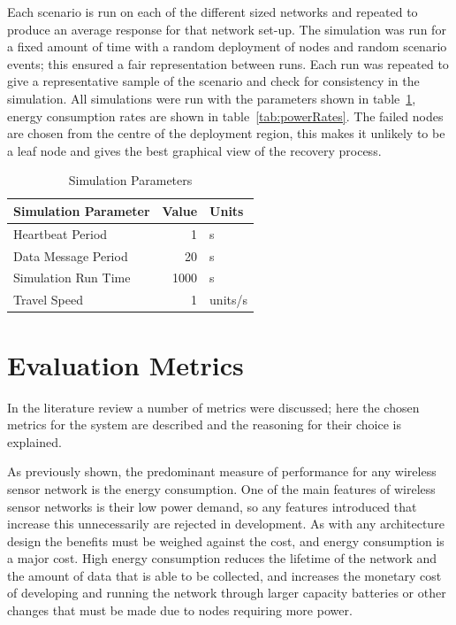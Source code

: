 \documentclass[authoryearcitations]{UoYCSproject}
\begin{document}
Each scenario is run on each of the different sized networks and repeated to produce an average response for that network set-up. The simulation was run for a fixed amount of time with a random deployment of nodes and random scenario events; this ensured a fair representation between runs. Each run was repeated to give a representative sample of the scenario and check for consistency in the simulation. All simulations were run with the parameters shown in table~\ref{tab:simParams}, energy consumption rates are shown in table~\ref{tab:powerRates}. The failed nodes are chosen from the centre of the deployment region, this makes it unlikely to be a leaf node and gives the best graphical view of the recovery process.

\begin{table}[]
\centering
\begin{tabular}{@{}lrl@{}}
\toprule
Simulation Parameter     & Value & Units   \\ \midrule
Heartbeat Period         & 1     & s       \\
Data Message Period      & 20    & s       \\
Simulation Run Time      & 1000  & s       \\
Travel Speed             & 1     & units/s \\ \bottomrule
\end{tabular}
\caption{Simulation Parameters}
\label{tab:simParams}
\end{table}

\section{Evaluation Metrics}

In the literature review a number of metrics were discussed; here the chosen metrics for the system are described and the reasoning for their choice is explained.

As previously shown, the predominant measure of performance for any wireless sensor network is the energy consumption. One of the main features of wireless sensor networks is their low power demand, so any features introduced that increase this unnecessarily are rejected in development. As with any architecture design the benefits must be weighed against the cost, and energy consumption is a major cost. High energy consumption reduces the lifetime of the network and the amount of data that is able to be collected, and increases the monetary cost of developing and running the network through larger capacity batteries or other changes that must be made due to nodes requiring more power.
\end{document}
